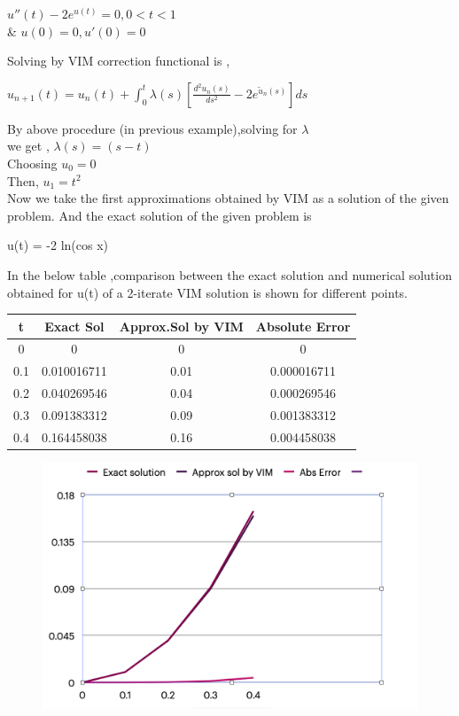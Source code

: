 \documentclass[12pt, a4paper]{report}
\begin{document}
\begin{center}
    $u''(t) - 2e^{u(t)} = 0 , 0<t<1 $ \\
    & $u(0) = 0 , u'(0) = 0$ \\
\end{center}
Solving by VIM correction functional is , 
\begin{center}
    $u_{n+1}(t) = u_n(t) + \int_{0}^{t} \lambda(s)\left  [\frac{{d^2u_n(s)}}{{ds^2}} - 2 e^{\tilde u_n(s)}\right ]  ds$
\end{center}
By above procedure (in previous example),solving for $\lambda $ \\
we get , $\lambda(s) = (s-t)$ \\
Choosing $u_0 = 0$ \\
Then, $u_1=t^2$ \\

Now we take the first approximations obtained by VIM as a solution of the given problem. And the exact solution of the given problem is 
\begin{center}
    u(t) = -2 ln(cos x)
\end{center}
 In the below table ,comparison between the exact solution and numerical solution obtained for u(t) of a 2-iterate VIM solution is shown for different points.

\begin{table}[ht]
\centering
\begin{tabular}{|c|c|c|c|}
\hline
t & Exact Sol & Approx.Sol by VIM & Absolute Error \\
\hline
0 & 0 & 0 & 0 \\
\hline
 0.1 & 0.010016711 & 0.01 & 0.000016711 \\
\hline
 0.2 & 0.040269546 & 0.04 &  0.000269546\\
\hline
 0.3 & 0.091383312 & 0.09 & 0.001383312 \\
\hline
 0.4 & 0.164458038 & 0.16 & 0.004458038  \\
\hline
\end{tabular}
\label{tab:mytable}
\end{table}

\bigskip 
\bigskip 
\bigskip 

\begin{figure}
    \centering
    \includegraphics[width=0.5\linewidth]{Screenshot 2023-09-18 at 3.43.03 PM.png}
    \caption{}
    \label{fig:enter-label}
\end{figure}
\end{document}
